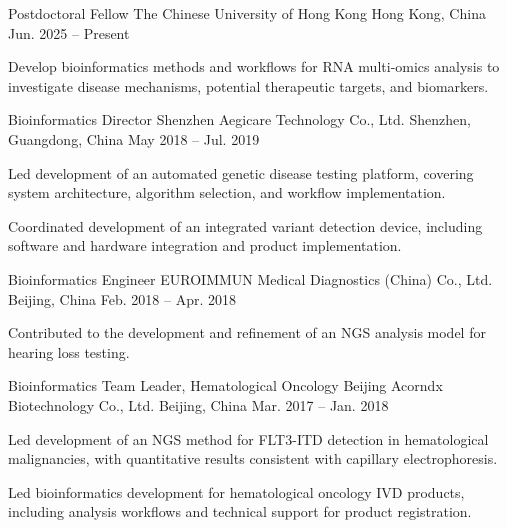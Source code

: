 
\begin{cventries}
  \cventry
    {Postdoctoral Fellow}
    {The Chinese University of Hong Kong}
    {Hong Kong, China}
    {Jun. 2025 -- Present}
    {
      \begin{cvitems}
        \item {Develop bioinformatics methods and workflows for RNA multi-omics analysis to investigate disease mechanisms, potential therapeutic targets, and biomarkers.}
      \end{cvitems}
    }

  \cventry
    {Bioinformatics Director}
    {Shenzhen Aegicare Technology Co., Ltd.}
    {Shenzhen, Guangdong, China}
    {May 2018 -- Jul. 2019}
    {
      \begin{cvitems}
        \item {Led development of an automated genetic disease testing platform, covering system architecture, algorithm selection, and workflow implementation.}
        \item {Coordinated development of an integrated variant detection device, including software and hardware integration and product implementation.}
      \end{cvitems}
    }

  \cventry
    {Bioinformatics Engineer}
    {EUROIMMUN Medical Diagnostics (China) Co., Ltd.}
    {Beijing, China}
    {Feb. 2018 -- Apr. 2018}
    {
      \begin{cvitems}
        \item {Contributed to the development and refinement of an NGS analysis model for hearing loss testing.}
      \end{cvitems}
    }

  \cventry
    {Bioinformatics Team Leader, Hematological Oncology}
    {Beijing Acorndx Biotechnology Co., Ltd.}
    {Beijing, China}
    {Mar. 2017 -- Jan. 2018}
    {
      \begin{cvitems}
        \item {Led development of an NGS method for FLT3-ITD detection in hematological malignancies, with quantitative results consistent with capillary electrophoresis.}
        \item {Led bioinformatics development for hematological oncology IVD products, including analysis workflows and technical support for product registration.}
      \end{cvitems}
    }


\end{cventries}
